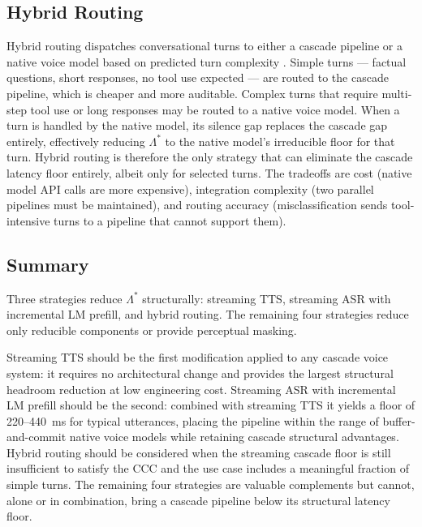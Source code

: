 \subsection{Hybrid Routing}

Hybrid routing dispatches conversational turns to either a cascade pipeline or a native
voice model based on predicted turn complexity \citep{dong2024building}.
Simple turns --- factual questions, short responses, no tool use expected ---
are routed to the cascade pipeline, which is cheaper and more auditable.
Complex turns that require multi-step tool use or long responses may be routed to a
native voice model.
When a turn is handled by the native model, its silence gap replaces the cascade gap
entirely, effectively reducing $\Lambda^*$ to the native model's irreducible floor
for that turn.
Hybrid routing is therefore the only strategy that can eliminate the cascade latency
floor entirely, albeit only for selected turns.
The tradeoffs are cost (native model API calls are more expensive),
integration complexity (two parallel pipelines must be maintained),
and routing accuracy (misclassification sends tool-intensive turns to a pipeline
that cannot support them).

\subsection{Summary}

Three strategies reduce $\Lambda^*$ structurally: streaming TTS, streaming ASR with
incremental LM prefill, and hybrid routing.
The remaining four strategies reduce only reducible components or provide perceptual masking.

Streaming TTS should be the first modification applied to any cascade voice system:
it requires no architectural change and provides the largest structural headroom reduction
at low engineering cost.
Streaming ASR with incremental LM prefill should be the second: combined with streaming TTS
it yields a floor of 220--440~ms for typical utterances, placing the pipeline within the
range of buffer-and-commit native voice models while retaining cascade structural advantages.
Hybrid routing should be considered when the streaming cascade floor is still insufficient
to satisfy the CCC and the use case includes a meaningful fraction of simple turns.
The remaining four strategies are valuable complements but cannot, alone or in combination,
bring a cascade pipeline below its structural latency floor.
